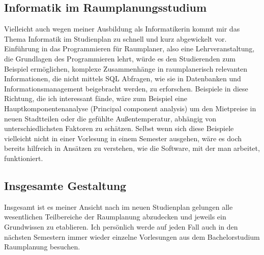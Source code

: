 \documentclass[]{article}
\begin{document}
\subsection{Informatik im Raumplanungsstudium}
Vielleicht auch wegen meiner Ausbildung als Informatikerin kommt mir das Thema Informatik im Studienplan zu schnell und kurz abgewickelt vor. Einführung in das Programmieren für Raumplaner, also eine Lehrveranstaltung, die Grundlagen des Programmieren lehrt, würde es den Studierenden zum Beispiel ermöglichen, komplexe Zusammenhänge in raumplanerisch relevanten Informationen, die nicht mittels SQL Abfragen, wie sie in Datenbanken und Informationsmanagement beigebracht werden, zu erforschen. Beispiele in diese Richtung, die ich interessant fände, wäre zum Beispiel eine Hauptkomponentenanalyse (Principal component analysis) um den Mietpreise in neuen Stadtteilen oder die gefühlte Außentemperatur, abhängig von unterschiedlichsten Faktoren zu schätzen. Selbst wenn sich diese Beispiele vielleicht nicht in einer Vorlesung in einem Semester ausgehen, wäre es doch bereits hilfreich in Ansätzen zu verstehen, wie die Software, mit der man arbeitet, funktioniert.

\subsection{Insgesamte Gestaltung}
Insgesamt ist es meiner Ansicht nach im neuen Studienplan gelungen alle wesentlichen Teilbereiche der Raumplanung abzudecken und jeweils ein Grundwissen zu etablieren. Ich persönlich werde auf jeden Fall auch in den nächsten Semestern immer wieder einzelne Vorlesungen aus dem Bachelorstudium Raumplanung besuchen.
\end{document}
